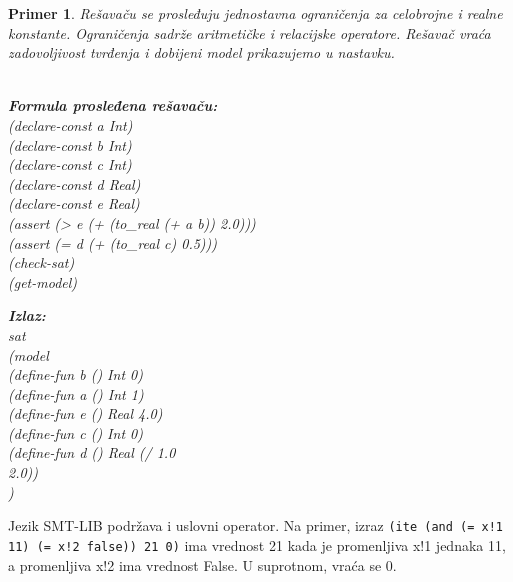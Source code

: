 \documentclass[12pt,oneside]{memoir}
\newcommand\tab[1][0.5cm]{\hspace*{#1}}
\newtheorem{primer}{Primer}
\begin{document}
\begin{primer} \label{example3} 
Rešavaču se prosleđuju jednostavna ograničenja za celobrojne i realne konstante.
Ograničenja sadrže aritmetičke i relacijske operatore. Rešavač vraća zadovoljivost tvrđenja i dobijeni model prikazujemo u nastavku.\\ \\
\begin{minipage}[b]{0.47\textwidth}
\textbf{Formula prosleđena rešavaču:}
\\(declare-const a Int)
\\(declare-const b Int)
\\(declare-const c Int)
\\(declare-const d Real)
\\(declare-const e Real)
\\(assert (> e (+ (to\_real (+ a b)) 2.0)))
\\(assert (= d (+ (to\_real c) 0.5)))
\\(check-sat)
\\(get-model)
\end{minipage}
\hspace{1.6cm}
\begin{minipage}[t]{0.4\textwidth}
\vspace{-6cm}
\textbf{Izlaz:}
\\sat 
\\(model
\\\tab(define-fun b () Int 0) 
\\\tab(define-fun a () Int 1) 
\\\tab(define-fun e () Real 4.0) 
\\\tab(define-fun c () Int 0) 
\\\tab(define-fun d () Real (/ 1.0 
\\\tab 2.0))
\\)
\end{minipage}

\end{primer}

Jezik SMT-LIB podržava i uslovni operator. Na primer,
izraz \texttt{(ite (and (= x!1 11) (= x!2 false)) 21 0)} ima vrednost 21 kada je promenljiva x!1 jednaka 11, a promenljiva x!2 ima vrednost False. U suprotnom, vraća se 0.
\end{document}

